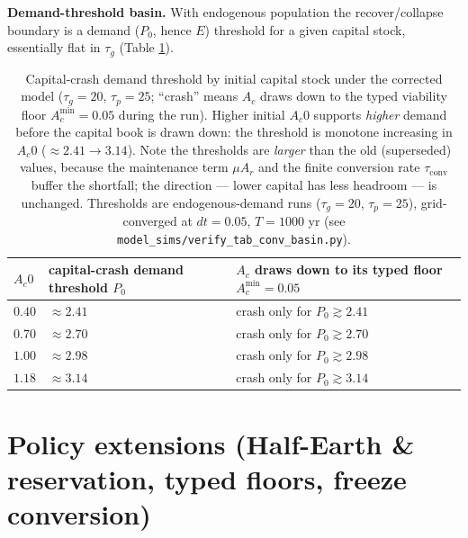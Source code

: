 \documentclass[11pt]{article}
\begin{document}
\noindent\textbf{Demand-threshold basin.} With endogenous population the recover/collapse boundary is a demand
($P_0$, hence $E$) threshold for a given capital stock, essentially flat in $\tau_g$ (Table
\ref{tab:basin}).

\begin{table}[htbp]
\centering
\small
\begin{tabularx}{\textwidth}{l>{\raggedright\arraybackslash}X>{\raggedright\arraybackslash}X}
\toprule
$A_c0$ & capital-crash demand threshold $P_0$ & $A_c$ draws down to its typed floor $A_c^{\min}=0.05$ \\
\midrule
$0.40$ & $\approx 2.41$ & crash only for $P_0\gtrsim2.41$ \\
$0.70$ & $\approx 2.70$ & crash only for $P_0\gtrsim2.70$ \\
$1.00$ & $\approx 2.98$ & crash only for $P_0\gtrsim2.98$ \\
$1.18$ & $\approx 3.14$ & crash only for $P_0\gtrsim3.14$ \\
\bottomrule
\end{tabularx}
\caption{Capital-crash demand threshold by initial capital stock under the corrected model ($\tau_g=20$,
$\tau_p=25$; ``crash'' means $A_c$ draws down to the typed viability floor $A_c^{\min}=0.05$ during the run).
Higher initial $A_c0$ supports \emph{higher} demand before the capital book is drawn down: the threshold is
monotone increasing in $A_c0$ ($\approx2.41\to3.14$). Note the thresholds are \emph{larger} than the old
(superseded) values, because the maintenance term $\mu A_r$ and the finite conversion rate $\tau_{\mathrm{conv}}$
buffer the shortfall; the direction --- lower capital has less headroom --- is unchanged. Thresholds are
endogenous-demand runs ($\tau_g=20$, $\tau_p=25$), grid-converged at $dt=0.05$, $T=1000$ yr
(see \texttt{model\_sims/verify\_tab\_conv\_basin.py}).}
\label{tab:basin}
\end{table}

\section{Policy extensions (Half-Earth \& reservation, typed floors, freeze conversion)}
\end{document}
